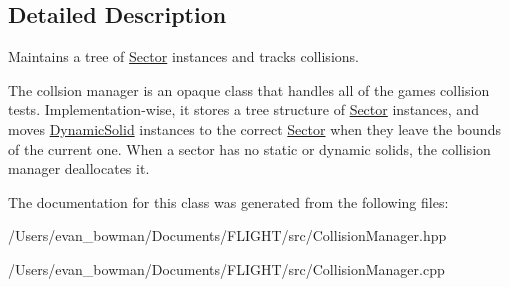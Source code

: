 \subsection{Detailed Description}
Maintains a tree of \hyperlink{class_f_l_i_g_h_t_1_1_sector}{Sector} instances and tracks collisions. 

The collsion manager is an opaque class that handles all of the game\textquotesingle{}s collision tests. Implementation-\/wise, it stores a tree structure of \hyperlink{class_f_l_i_g_h_t_1_1_sector}{Sector} instances, and moves \hyperlink{class_f_l_i_g_h_t_1_1_dynamic_solid}{Dynamic\+Solid} instances to the correct \hyperlink{class_f_l_i_g_h_t_1_1_sector}{Sector} when they leave the bounds of the current one. When a sector has no static or dynamic solids, the collision manager deallocates it. 

The documentation for this class was generated from the following files\+:\begin{DoxyCompactItemize}
\item 
/\+Users/evan\+\_\+bowman/\+Documents/\+F\+L\+I\+G\+H\+T/src/Collision\+Manager.\+hpp\item 
/\+Users/evan\+\_\+bowman/\+Documents/\+F\+L\+I\+G\+H\+T/src/Collision\+Manager.\+cpp\end{DoxyCompactItemize}
